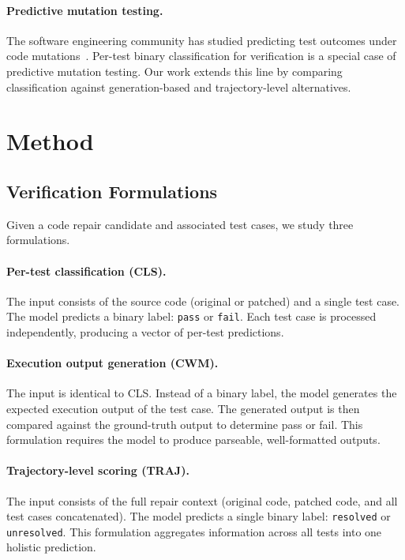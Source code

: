 \documentclass[11pt,a4paper]{article}
\begin{document}
\paragraph{Predictive mutation testing.}
The software engineering community has studied predicting test outcomes under code mutations~\cite{zhang2018predictive}. Per-test binary classification for verification is a special case of predictive mutation testing. Our work extends this line by comparing classification against generation-based and trajectory-level alternatives.

\section{Method}

\subsection{Verification Formulations}

Given a code repair candidate and associated test cases, we study three formulations.

\paragraph{Per-test classification (CLS).}
The input consists of the source code (original or patched) and a single test case. The model predicts a binary label: \texttt{pass} or \texttt{fail}. Each test case is processed independently, producing a vector of per-test predictions.

\paragraph{Execution output generation (CWM).}
The input is identical to CLS. Instead of a binary label, the model generates the expected execution output of the test case. The generated output is then compared against the ground-truth output to determine pass or fail. This formulation requires the model to produce parseable, well-formatted outputs.

\paragraph{Trajectory-level scoring (TRAJ).}
The input consists of the full repair context (original code, patched code, and all test cases concatenated). The model predicts a single binary label: \texttt{resolved} or \texttt{unresolved}. This formulation aggregates information across all tests into one holistic prediction.
\end{document}
